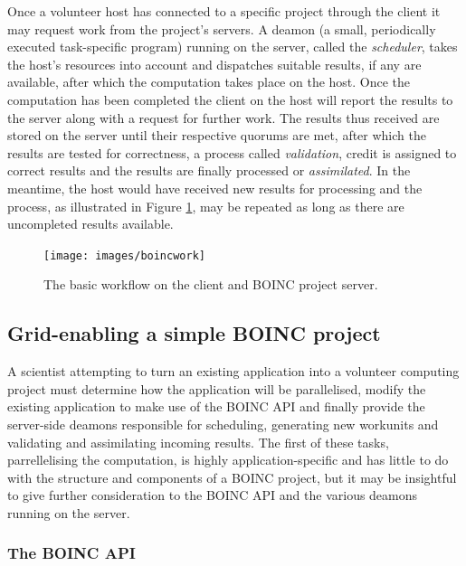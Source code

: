 Once a volunteer host has  connected to a specific project through the client it may request work from the project's servers. 
A deamon (a small, periodically executed task-specific program) running on the server,  called the \emph{scheduler}, takes the host's resources into account and dispatches suitable results, if any are available, after which the computation takes place on the host. 
Once the computation has been completed the client on the host will  report the results to the server along with a   request for further work. 
The   results thus received are stored on the server until their respective quorums are met, after which the results are tested for correctness, a process called \emph{validation},   credit is assigned to correct results and the results are finally processed or \emph{assimilated}. 
In the meantime, the host would have received new results for processing and the process, as illustrated in Figure \ref{fig:workflow}, may be repeated as long as there are uncompleted results available.
\begin{figure}[htb]
\centering
\texttt{[image: images/boincwork]}
\caption{The basic workflow on the client and BOINC project server.}\label{fig:workflow}\vspace{-.2cm}
\end{figure}
\subsection{Grid-enabling a simple BOINC project} \label{Bgridenable}
A scientist attempting to turn an existing application into a volunteer computing project must  determine how the application will be parallelised, modify the existing application to make use of the BOINC API and finally provide the server-side deamons responsible for scheduling,  generating new workunits and validating and assimilating incoming results.
The first of these tasks, parrellelising the computation, is highly application-specific and has little to do with the structure and components of a BOINC project, but it may be insightful to give further consideration to the BOINC API and the various deamons running on the server.
\subsubsection{The BOINC API} \label{Bapi}

